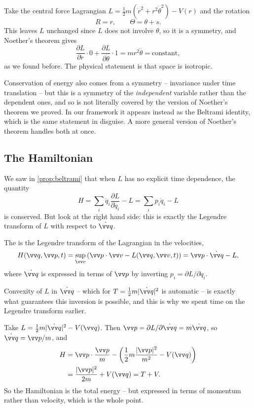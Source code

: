 \begin{example}
	Take the central force Lagrangian $L = \frac12 m(\dot r^2 + r^2\dot\theta^2) - V(r)$ and the rotation
	$$
	R = r, \qquad \Theta = \theta + s.
	$$
	This leaves $L$ unchanged since $L$ does not involve $\theta$, so it is a symmetry, and Noether's theorem gives
	$$
	\frac{\partial L}{\partial \dot r}\cdot 0 + \frac{\partial L}{\partial \dot\theta}\cdot 1 = mr^2\dot\theta = \text{constant},
	$$
	as we found before. The physical statement is that space is isotropic.
\end{example}

\begin{remark}
	Conservation of energy also comes from a symmetry -- invariance under time translation -- but this is a symmetry of the \emph{independent} variable rather than the dependent ones, and so is not literally covered by the version of Noether's theorem we proved. In our framework it appears instead as the Beltrami identity, which is the same statement in disguise. A more general version of Noether's theorem handles both at once.
\end{remark}

\subsection{The Hamiltonian}

We saw in \autoref{prop:beltrami} that when $L$ has no explicit time dependence, the quantity
$$
H = \sum_i \dot q_i \frac{\partial L}{\partial \dot q_i} - L = \sum_i p_i \dot q_i - L
$$
is conserved. But look at the right hand side: this is exactly the Legendre transform of $L$ with respect to $\dot{\vv q}$.

\begin{definition}[Hamiltonian]
	The  is the Legendre transform of the Lagrangian in the velocities,
	$$
	H(\vv q, \vv p, t) = \sup_{\vv v}\left(\vv p \cdot \vv v - L(\vv q, \vv v, t)\right) = \vv p \cdot \dot{\vv q} - L,
	$$
	where $\dot{\vv q}$ is expressed in terms of $\vv p$ by inverting $p_i = \partial L/\partial \dot q_i$.
\end{definition}

Convexity of $L$ in $\dot{\vv q}$ -- which for $T = \frac12 m|\dot{\vv q}|^2$ is automatic -- is exactly what guarantees this inversion is possible, and this is why we spent time on the Legendre transform earlier.

\begin{example}
	Take $L = \frac12 m|\dot{\vv q}|^2 - V(\vv q)$. Then $\vv p = \partial L/\partial \dot{\vv q} = m\dot{\vv q}$, so $\dot{\vv q} = \vv p/m$, and
	\begin{align*}
		H &= \vv p \cdot \frac{\vv p}{m} - \left(\frac{1}{2}m\frac{|\vv p|^2}{m^2} - V(\vv q)\right) \\
		&= \frac{|\vv p|^2}{2m} + V(\vv q) = T + V.
	\end{align*}
	So the Hamiltonian is the total energy -- but expressed in terms of momentum rather than velocity, which is the whole point.
\end{example}

